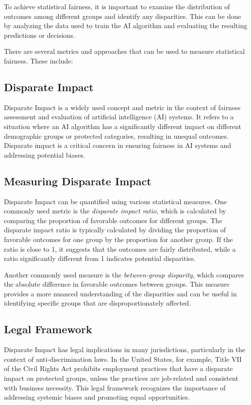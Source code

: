 \documentclass[12pt,a4paper,openright,twoside]{book}
\begin{document}
To achieve statistical fairness, it is important to examine the distribution of outcomes among different groups and identify any disparities. This can be done by analyzing the data used to train the AI algorithm and evaluating the resulting predictions or decisions.

There are several metrics and approaches that can be used to measure statistical fairness. These include:

\subsection{Disparate Impact}

Disparate Impact is a widely used concept and metric in the context of fairness assessment and evaluation of artificial intelligence (AI) systems. It refers to a situation where an AI algorithm has a significantly different impact on different demographic groups or protected categories, resulting in unequal outcomes. Disparate impact is a critical concern in ensuring fairness in AI systems and addressing potential biases.

\subsection{Measuring Disparate Impact}

Disparate Impact can be quantified using various statistical measures. One commonly used metric is the \textit{disparate impact ratio}, which is calculated by comparing the proportion of favorable outcomes for different groups. The disparate impact ratio is typically calculated by dividing the proportion of favorable outcomes for one group by the proportion for another group. If the ratio is close to 1, it suggests that the outcomes are fairly distributed, while a ratio significantly different from 1 indicates potential disparities.

Another commonly used measure is the \textit{between-group disparity}, which compares the absolute difference in favorable outcomes between groups. This measure provides a more nuanced understanding of the disparities and can be useful in identifying specific groups that are disproportionately affected.

\subsection{Legal Framework}

Disparate Impact has legal implications in many jurisdictions, particularly in the context of anti-discrimination laws. In the United States, for example, Title VII of the Civil Rights Act prohibits employment practices that have a disparate impact on protected groups, unless the practices are job-related and consistent with business necessity. This legal framework recognizes the importance of addressing systemic biases and promoting equal opportunities.
\end{document}
